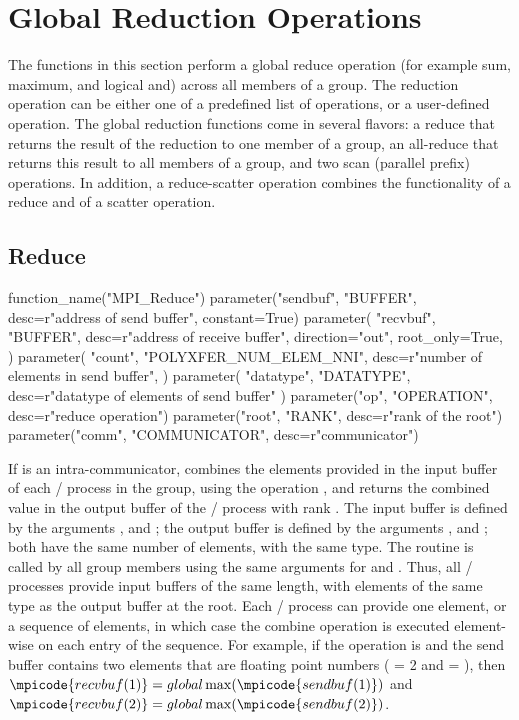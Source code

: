 \section{Global Reduction Operations}
\label{global-reduce}

The functions in this section perform a global reduce operation
(for example sum, maximum, and logical and) across
all members of a group.
The reduction operation can be either one of a predefined list of
operations, or a user-defined operation.
The global reduction functions come in several flavors: a reduce that
returns the result of the reduction
to one member of a group,
an all-reduce that
returns this result
to all members of a group,
and
two
scan (parallel prefix)
operations.
In addition, a reduce-scatter operation combines the
functionality of a reduce and of a scatter operation.

\subsection{Reduce}
\label{subsec:coll-reduce}

%
\begin{mpi-binding}
    function_name("MPI_Reduce")
    parameter("sendbuf", "BUFFER", desc=r"address of send buffer", constant=True)
    parameter(
        "recvbuf",
        "BUFFER",
        desc=r"address of receive buffer",
        direction="out",
        root_only=True,
    )
    parameter(
        "count",
        "POLYXFER_NUM_ELEM_NNI",
        desc=r"number of elements in send buffer",
    )
    parameter(
        "datatype", "DATATYPE", desc=r"datatype of elements of send buffer"
    )
    parameter("op", "OPERATION", desc=r"reduce operation")
    parameter("root", "RANK", desc=r"rank of the root")
    parameter("comm", "COMMUNICATOR", desc=r"communicator")
\end{mpi-binding}

If  is an intra-communicator,
 combines the elements provided
in the input buffer of each \MPI/ process in the
group, using the operation , and returns the combined value in
the output buffer of the \MPI/ process with rank .
The input buffer is defined by the arguments ,
 and ; the output buffer is defined by
the arguments ,  and ;
both have the same number of elements, with the same type.
The routine is called by all group members using the same arguments
for  and .
Thus, all \MPI/ processes provide input buffers of the
same length, with elements of the same type as the output buffer at the root.
Each \MPI/ process can provide one element, or a sequence of elements,
in which case the
combine operation is executed element-wise on each entry of the sequence.
For example, if the operation is  and the send buffer
contains two elements that are floating point numbers ( = 2 and
 = ), then $\mpicode{recvbuf(1)} =
global \max (\mpicode{sendbuf(1)})$ and $\mpicode{recvbuf(2)} = global \max ( \mpicode{sendbuf(2)})$.

